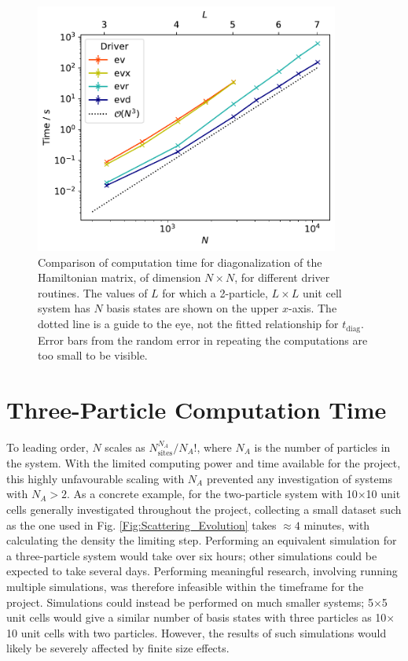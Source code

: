 \vspace{1cm}

\begin{figure}[ht]
    \centering
    \includegraphics[width=10cm]{Figures/Driver_Time_Comparison}
    \caption{Comparison of computation time for diagonalization of the Hamiltonian matrix, of dimension $N\times N$, for different driver routines. The values of $L$ for which a 2-particle, $L\times L$ unit cell system has $N$ basis states are shown on the upper $x$-axis. The dotted line is a guide to the eye, not the fitted relationship for $t_{\text{diag}}$. Error bars from the random error in repeating the computations are too small to be visible.}
    \label{Fig:Driver_Time_Comparison}
\end{figure}

\newpage

\section{Three-Particle Computation Time}\label{App:ThreeParticle}

To leading order, $N$ scales as $N_{\text{sites}}^{N_A}/N_A!$, where $N_A$ is the number of particles in the system. With the limited computing power and time available for the project, this highly unfavourable scaling with $N_A$ prevented any investigation of systems with $N_A>2$. As a concrete example, for the two-particle system with 10$\times$10 unit cells generally investigated throughout the project, collecting a small dataset such as the one used in Fig. \ref{Fig:Scattering_Evolution} takes $\approx 4$ minutes, with calculating the density the limiting step. Performing an equivalent simulation for a three-particle system would take over six hours; other simulations could be expected to take several days. Performing meaningful research, involving running multiple simulations, was therefore infeasible within the timeframe for the project. Simulations could instead be performed on much smaller systems; 5$\times$5 unit cells would give a similar number of basis states with three particles as 10$\times$10 unit cells with two particles. However, the results of such simulations would likely be severely affected by finite size effects.
